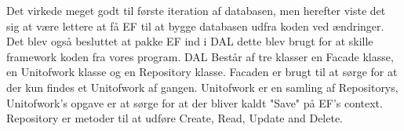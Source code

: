 Det virkede meget godt til første iteration af databasen, men herefter viste det sig at være lettere at få \gls{EF} til at bygge
databasen udfra koden ved ændringer.
\newline
Det blev også besluttet at pakke \gls{EF} ind i \gls{DAL} dette blev brugt for at skille framework koden fra vores program.
\gls{DAL} Består af tre klasser en Facade klasse, en Unitofwork klasse og en Repository klasse. 
Facaden er brugt til at sørge for at der kun findes et Unitofwork af gangen. 
Unitofwork er en samling af Repositorys, Unitofwork's opgave er at sørge for at der bliver kaldt "Save" på \gls{EF}'s context.
Repository er metoder til at udføre Create, Read, Update and Delete.
